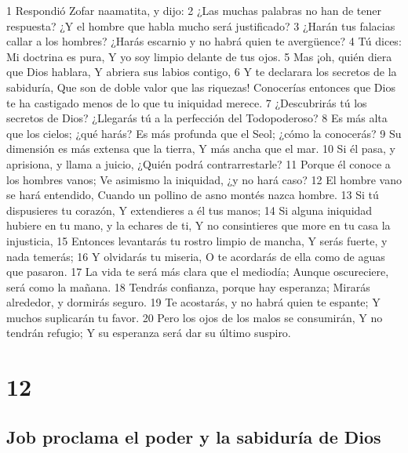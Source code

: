 1 Respondió Zofar naamatita, y dijo:  
2 ¿Las muchas palabras no han de tener respuesta?  
¿Y el hombre que habla mucho será justificado?  
3 ¿Harán tus falacias callar a los hombres?  
¿Harás escarnio y no habrá quien te avergüence?  
4 Tú dices: Mi doctrina es pura,  
Y yo soy limpio delante de tus ojos.  
5 Mas ¡oh, quién diera que Dios hablara,  
Y abriera sus labios contigo,  
6 Y te declarara los secretos de la sabiduría,  
Que son de doble valor que las riquezas!  
Conocerías entonces que Dios te ha castigado menos de lo que tu iniquidad merece.  
7 ¿Descubrirás tú los secretos de Dios?  
¿Llegarás tú a la perfección del Todopoderoso?  
8 Es más alta que los cielos; ¿qué harás?  
Es más profunda que el Seol; ¿cómo la conocerás?  
9 Su dimensión es más extensa que la tierra,  
Y más ancha que el mar.  
10 Si él pasa, y aprisiona, y llama a juicio,  
¿Quién podrá contrarrestarle?  
11 Porque él conoce a los hombres vanos;  
Ve asimismo la iniquidad, ¿y no hará caso?  
12 El hombre vano se hará entendido,  
Cuando un pollino de asno montés nazca hombre.  
13 Si tú dispusieres tu corazón,  
Y extendieres a él tus manos;  
14 Si alguna iniquidad hubiere en tu mano, y la echares de ti,  
Y no consintieres que more en tu casa la injusticia,  
15 Entonces levantarás tu rostro limpio de mancha,  
Y serás fuerte, y nada temerás;  
16 Y olvidarás tu miseria,  
O te acordarás de ella como de aguas que pasaron.  
17 La vida te será más clara que el mediodía;  
Aunque oscureciere, será como la mañana.  
18 Tendrás confianza, porque hay esperanza;  
Mirarás alrededor, y dormirás seguro.  
19 Te acostarás, y no habrá quien te espante;  
Y muchos suplicarán tu favor.  
20 Pero los ojos de los malos se consumirán,  
Y no tendrán refugio; 
Y su esperanza será dar su último suspiro.  

\chapter{12}

\section*{Job proclama el poder y la sabiduría de Dios}  

